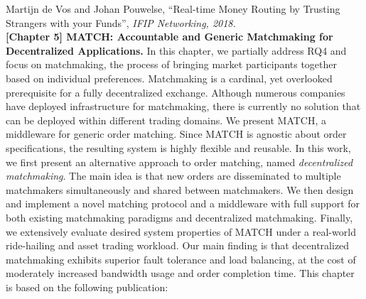 Martijn de Vos and Johan Pouwelse, \enquote{Real-time Money Routing by Trusting Strangers with your Funds}, \emph{IFIP Networking, 2018.}\\

\textbf{[Chapter 5] MATCH: Accountable and Generic Matchmaking for Decentralized Applications.}
In this chapter, we partially address RQ4 and focus on matchmaking, the process of bringing market participants together based on individual preferences.
Matchmaking is a cardinal, yet overlooked prerequisite for a fully decentralized exchange.
Although numerous companies have deployed infrastructure for matchmaking, there is currently no solution that can be deployed within different trading domains.
We present MATCH, a middleware for generic order matching.
Since MATCH is agnostic about order specifications, the resulting system is highly flexible and reusable.
In this work, we first present an alternative approach to order matching, named \emph{decentralized matchmaking}.
The main idea is that new orders are disseminated to multiple matchmakers simultaneously and shared between matchmakers.
We then design and implement a novel matching protocol and a middleware with full support for both existing matchmaking paradigms and decentralized matchmaking.
Finally, we extensively evaluate desired system properties of MATCH under a real-world ride-hailing and asset trading workload.
Our main finding is that decentralized matchmaking exhibits superior fault tolerance and load balancing, at the cost of moderately increased bandwidth usage and order completion time.
This chapter is based on the following publication:

\\

